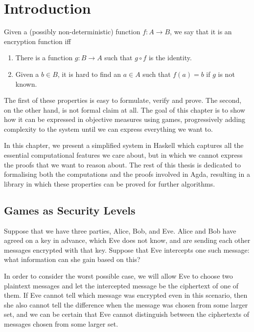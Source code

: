 \chapter{Introduction}

Given a (possibly non-deterministic) function $f : A \to B$, we say that it is an encryption function iff
\begin{enumerate}
    \itemsep0em
    \item There is a function $g : B \to A$ such that $g \circ f$ is the identity.
    \item Given a $b \in B$, it is hard to find an $a \in A$ such that $f(a) = b$ if $g$ is not known.
\end{enumerate}

The first of these properties is easy to formulate, verify and prove.  The second, on the other hand, is not formal
claim at all.  The goal of this chapter is to show how it can be expressed in objective measures using games,
progressively adding complexity to the system until we can express everything we want to.

In this chapter, we present a simplified system in Haskell which captures all the essential computational features we
care about, but in which we cannot express the proofs that we want to reason about.  The rest of this thesis is
dedicated to formalising both the computations and the proofs involved in Agda, resulting in a library in which these
properties can be proved for further algorithms.





\section{Games as Security Levels}

Suppose that we have three parties, Alice, Bob, and Eve.  Alice and Bob have agreed on a key in advance, which Eve does
not know, and are sending each other messages encrypted with that key.  Suppose that Eve intercepts one such message:
what information can she gain based on this?

In order to consider the worst possible case, we will allow Eve to choose two plaintext messages and let the intercepted
message be the ciphertext of one of them.  If Eve cannot tell which message was encrypted even in this scenario, then
she also cannot tell the difference when the message was chosen from some larger set, and we can be certain that Eve
cannot distinguish between the ciphertexts of messages chosen from some larger set.

